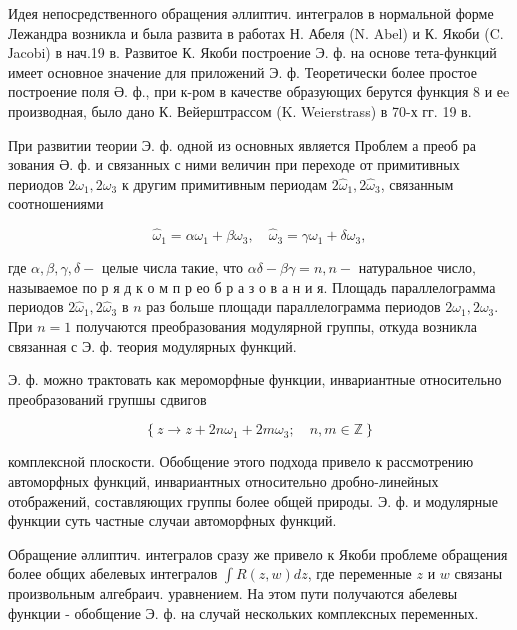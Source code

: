 \documentclass[10pt]{article}
\begin{document}
Идея непосредственного обращения әллиптич. интегралов в нормальной форме Лежандра возникла и была развита в работах Н. Абеля (N. Abel) и К. Якоби (C. Јacobi) в нач.19 в. Развитое К. Якоби построение Э. ф. на основе тета-функций имеет основное значение для приложений Э. ф. Теоретически более простое построение поля Ә. ф., при к-ром в качестве образующих берутся функция 8 и еe производная, было дано К. Вейерштрассом (K. Weierstrass) в 70-х гг. 19 в.



При развитии теории Э. ф. одной из основных является Проблем а преоб ра зования Ә. ф. и связанных с ними величин при переходе от примитивных периодов $2 \omega_{1}, 2 \omega_{3}$ к другим примитивным периодам $2 \hat{\omega}_{1}, 2 \hat{\omega}_{3}$, связанным соотношениями



\[

\hat{\omega}_{1}=\alpha \omega_{1}+\beta \omega_{3}, \quad \hat{\omega}_{3}=\gamma \omega_{1}+\delta \omega_{3},

\]



где $\alpha, \beta, \gamma, \delta-$ целые числа такие, что $\alpha \delta-\beta \gamma=n, n-$ натуральное число, называемое по р я д к о м п р ео б р а з о в а н и я. Площадь параллелограмма периодов $2 \hat{\omega}_{1}, 2 \hat{\omega}_{3}$ в $n$ раз больше площади параллелограмма периодов $2 \omega_{1}, 2 \omega_{3}$. При $n=1$ получаются преобразования модулярной группы, откуда возникла связанная с Э. ф. теория модулярных функций.



Э. ф. можно трактовать как мероморфные функции, инвариантные относительно преобразований групшы сдвигов



\[

\left\{z \longrightarrow z+2 n \omega_{1}+2 m \omega_{3} ; \quad n, m \in \mathbb{Z}\right\}

\]



комплексной плоскости. Обобщение этого подхода привело к рассмотрению автоморфных функций, инвариантных относительно дробно-линейных отображений, составляющих группы более общей природы. Э. ф. и модулярные функции суть частные случаи автоморфных функций.



Обращение әллиптич. интегралов сразу же привело к Якоби проблеме обращения более общих абелевых интегралов $\int R(z, w) d z$, где переменные $z$ и $w$ связаны произвольным алгебраич. уравнением. На этом пути получаются абелевы функции - обобщение Э. ф. на случай нескольких комплексных переменных.
\end{document}
